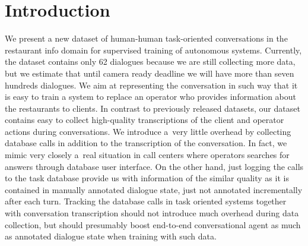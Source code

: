 \documentclass[runningheads,a4paper]{llncs}
\def\OP#1{#1}  %
\begin{document}
\section{Introduction}\label{sec:intro}
\vspace{-0.50em}
We present a new dataset of human-human task-oriented conversations in the restaurant info domain for supervised training of autonomous systems. 
Currently, the dataset contains only \OP{62} dialogues because we are still collecting more data, but we estimate that until camera ready deadline we will have more than seven hundreds dialogues. 
We aim at representing the conversation in such way that it is easy to train a system to replace an operator who provides information about the restaurants to clients.
In contrast to previously released datasets, our dataset contains easy to collect high-quality transcriptions of the client and operator actions during conversations.
We introduce a~very little overhead by collecting database calls in addition to the transcription of the conversation. 
In fact, we mimic very closely a~real situation in call centers where operators searches for answers through database user interface. 
On the other hand, just logging the calls to the task database provide us with information of the similar quality as it is contained in manually annotated dialogue state, just not annotated incrementally after each turn.
Tracking the database calls in task oriented systems together with conversation transcription should not introduce much overhead during data collection, but should presumably boost end-to-end conversational agent as much as annotated dialogue state when training with such data.
\end{document}

